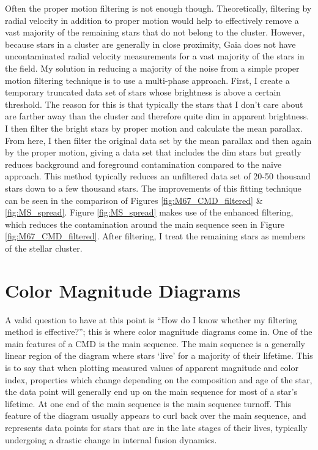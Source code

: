 \documentclass[aps,prb,twocolumn,groupedaddress,nofootinbib,floatfix]{revtex4-1}
\begin{document}
Often the proper motion filtering is not enough though. Theoretically, filtering by radial velocity in addition to proper motion would help to effectively remove a vast majority of the remaining stars that do not belong to the cluster. However, because stars in a cluster are generally in close proximity, Gaia does not have uncontaminated radial velocity measurements for a vast majority of the stars in the field. My solution in reducing a majority of the noise from a simple proper motion filtering technique is to use a multi-phase approach. First, I create a temporary truncated data set of stars whose brightness is above a certain threshold. The reason for this is that typically the stars that I don't care about are farther away than the cluster and therefore quite dim in apparent brightness. I then filter the bright stars by proper motion and calculate the mean parallax. From here, I then filter the original data set by the mean parallax and then again by the proper motion, giving a data set that includes the dim stars but greatly reduces background and foreground contamination compared to the naive approach. This method typically reduces an unfiltered data set of 20-50 thousand stars down to a few thousand stars. The improvements of this fitting technique can be seen in the comparison of Figures \ref{fig:M67_CMD_filtered} \& \ref{fig:MS_spread}. Figure \ref{fig:MS_spread} makes use of the enhanced filtering, which reduces the contamination around the main sequence seen in Figure \ref{fig:M67_CMD_filtered}. After filtering, I treat the remaining stars as members of the stellar cluster.

\section*{Color Magnitude Diagrams}
A valid question to have at this point is ``How do I know whether my filtering method is effective?''; this is where color magnitude diagrams come in. One of the main features of a CMD is the main sequence. The main sequence is a generally linear region of the diagram where stars `live' for a majority of their lifetime. This is to say that when plotting measured values of apparent magnitude and color index, properties which change depending on the composition and age of the star, the data point will generally end up on the main sequence for most of a star's lifetime. At one end of the main sequence is the main sequence turnoff. This feature of the diagram usually appears to curl back over the main sequence, and represents data points for stars that are in the late stages of their lives, typically undergoing a drastic change in internal fusion dynamics. 
\end{document}
